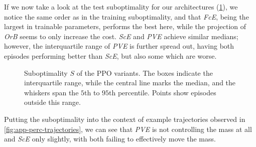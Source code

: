 

If we now take a look at the test suboptimality for our architectures (\cref{fig:perc-subopt}), we notice the same order as in
the training suboptimality, and that \emph{FcE}, being the largest in trainable parameters, performs the best here, while the projection
of \emph{OrB} seems to only increase the cost. \emph{ScE} and \emph{PVE} achieve similar medians; however, the interquartile range of \emph{PVE} is further
spread out, having both episodes performing better than \emph{ScE}, but also some which are worse.

\begin{figure}[htbp]
  \centering
  \caption[Suboptimality $S$ of the PPO variants]{Suboptimality $S$ of the PPO variants. The boxes indicate the interquartile range, while
  the central line marks the median, and the whiskers span the $5$th to $95$th percentile. Points show episodes outside this range.}
  \label{fig:perc-subopt}
\end{figure}

Putting the suboptimality into the context of example trajectories observed in \cref{fig:app-perc-trajectories}, we can see that \emph{PVE} is
not controlling the mass at all and \emph{ScE} only slightly, with both failing to effectively move the mass.

